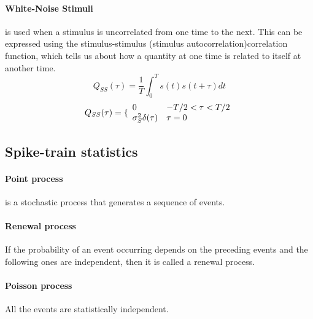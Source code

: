 \documentclass{report}
\begin{document}
\paragraph{White-Noise Stimuli} is used when a stimulus is uncorrelated from one time to the next. This can be expressed using the stimulus-stimulus (stimulus autocorrelation)correlation function, which tells us about how a quantity at one time is related to itself at another time.
\begin{equation}
Q_{SS}(\tau) = \frac{1}{T}\int_{0}^{T}s(t)s(t+\tau) dt
\end{equation}
\begin{equation}
Q_{SS}(\tau) = \{
\begin{array}{ll}
0 & -T/2 < \tau <T/2\\
\sigma_{S}^{2}\delta(\tau)  & \tau = 0\\
\end{array}
\\
\end{equation}
\subsection{Spike-train statistics}
\paragraph{Point process}
is a stochastic process that generates a sequence of events. 
\paragraph{Renewal process }
If the probability of an event occurring depends on the preceding events and the following ones are independent, then it is called a renewal process.
\paragraph{Poisson process }All the events are statistically independent. 
\end{document}
